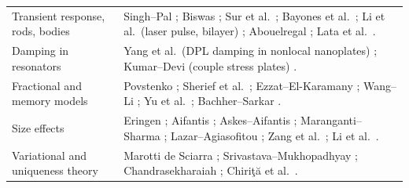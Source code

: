 \begin{table}[t]
\begin{tabularx}{\textwidth}{@{}p{3.2cm}X@{}}
Transient response, rods, bodies & Singh--Pal \citep{Singh2019,Singh2020a}; Biswas \citep{Biswas2019}; Sur et al.\ \citep{Sur2019,Sur2025}; Bayones et al.\ \citep{Bayones2021}; Li et al.\ (laser pulse, bilayer) \citep{Li2019}; Abouelregal \citep{Abouelregal2023,Abouelregal2020,Abouelregal2020a}; Lata et al.\ \citep{Lata2020}.\\
Damping in resonators & Yang et al.\ (DPL damping in nonlocal nanoplates) \citep{Yang2021}; Kumar--Devi (couple stress plates) \citep{Kumar2017}.\\
Fractional and memory models & Povstenko \citep{Povstenko2004,Povstenko2009,Povstenko2011Cattaneo,Povstenko2016}; Sherief et al.\ \citep{Sherief2010Fractional}; Ezzat--El-Karamany \citep{Ezzat2011}; Wang--Li \citep{Wang2011,Wang2021,WangLi2025IV}; Yu et al.\ \citep{Yu2024}; Bachher--Sarkar \citep{Bachher2019}.\\
Size effects & Eringen \citep{Eringen1972,Eringen1983}; Aifantis \citep{Aifantis1992}; Askes--Aifantis \citep{Askes2006,Askes2011}; Maranganti--Sharma \citep{Maranganti2006,Maranganti2007}; Lazar--Agiasofitou \citep{Lazar2022}; Zang et al.\ \citep{Zang2014}; Li et al.\ \citep{Li2018}.\\
Variational and uniqueness theory & Marotti de Sciarra \citep{Marotti2013}; Srivastava--Mukhopadhyay \citep{Srivastava2026}; Chandrasekharaiah \citep{Chandrasekharaiah1996}; Chiri\c{t}\u{a} et al.\ \citep{Chirita2016,Tibullo2017}.\\
\bottomrule\end{tabularx}
\end{table}

